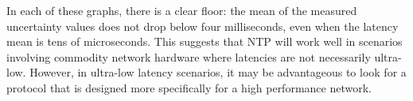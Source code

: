 In each of these graphs, there is a clear floor: the mean of the
measured uncertainty values does not drop below four
milliseconds, even when the latency mean is tens of microseconds. 
This suggests that NTP will work well in scenarios
involving commodity network hardware where latencies are not necessarily ultra-
low. However, in ultra-low latency scenarios, it may be advantageous to look 
for a protocol that is designed more specifically for a high performance 
network.











